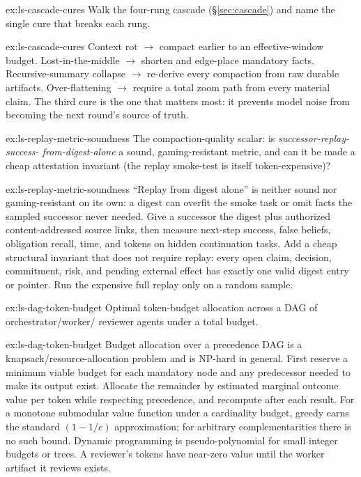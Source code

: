 \documentclass[11pt,a4paper]{article}
\theoremstyle{definition}
\theoremstyle{plain}
\begin{document}
\begin{pdexercise}[kind=Trace,rating=2]{ex:ls-cascade-cures}
Walk the four-rung cascade
(\S\ref{sec:cascade}) and name the single cure that breaks each rung.
\end{pdexercise}
\begin{pdsolution}{ex:ls-cascade-cures}
Context rot $\to$ compact earlier to an effective-window budget. Lost-in-the-middle $\to$ shorten and edge-place mandatory facts. Recursive-summary collapse $\to$ re-derive every compaction from raw durable artifacts. Over-flattening $\to$ require a total zoom path from every material claim. The third cure is the one that matters most: it prevents model noise from becoming the next round's source of truth.
\end{pdsolution}
\begin{pdexercise}[kind=Open,rating=3]{ex:ls-replay-metric-soundness}
The compaction-quality scalar: is \emph{successor-replay-success-
from-digest-alone} a sound, gaming-resistant metric, and can it be made a cheap
attestation invariant (the replay smoke-test is itself token-expensive)?
\end{pdexercise}
\begin{pdsolution}{ex:ls-replay-metric-soundness}
``Replay from digest alone'' is neither sound nor gaming-resistant on its own: a digest can overfit the smoke task or omit facts the sampled successor never needed. Give a successor the digest plus authorized content-addressed source links, then measure next-step success, false beliefs, obligation recall, time, and tokens on hidden continuation tasks. Add a cheap structural invariant that does not require replay: every open claim, decision, commitment, risk, and pending external effect has exactly one valid digest entry or pointer. Run the expensive full replay only on a random sample.
\end{pdsolution}
\begin{pdexercise}[kind=Open,rating=3]{ex:ls-dag-token-budget}
Optimal token-budget allocation across a DAG of orchestrator/worker/
reviewer agents under a total budget.
\end{pdexercise}
\begin{pdsolution}{ex:ls-dag-token-budget}
Budget allocation over a precedence DAG is a knapsack/resource-allocation problem and is NP-hard in general. First reserve a minimum viable budget for each mandatory node and any predecessor needed to make its output exist. Allocate the remainder by estimated marginal outcome value per token while respecting precedence, and recompute after each result. For a monotone submodular value function under a cardinality budget, greedy earns the standard $(1-1/e)$ approximation; for arbitrary complementarities there is no such bound. Dynamic programming is pseudo-polynomial for small integer budgets or trees. A reviewer's tokens have near-zero value until the worker artifact it reviews exists.
\end{pdsolution}
\end{document}
